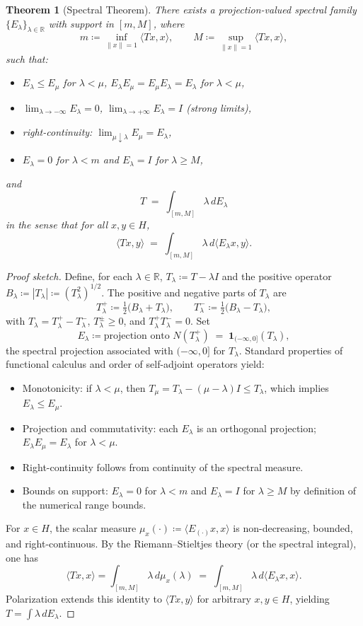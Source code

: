 \documentclass[11pt]{article}
\theoremstyle{plain}
\newtheorem{theorem}{Theorem}
\theoremstyle{definition}
\newcommand{\norm}[1]{\left\lVert #1 \right\rVert}
\begin{document}
\begin{theorem}[Spectral Theorem]
There exists a projection-valued spectral family $\{E_\lambda\}_{\lambda\in\mathbb{R}}$ with support in $[m,M]$, where
\[
m \coloneqq \inf_{\norm{x}=1}\langle Tx,x\rangle,\qquad M \coloneqq \sup_{\norm{x}=1}\langle Tx,x\rangle,
\]
such that:
\begin{itemize}
\item $E_\lambda \le E_\mu$ for $\lambda<\mu$, $E_\lambda E_\mu=E_\mu E_\lambda=E_\lambda$ for $\lambda<\mu$,
\item $\lim_{\lambda\to -\infty}E_\lambda=0$, $\lim_{\lambda\to +\infty}E_\lambda=I$ (strong limits),
\item right-continuity: $\lim_{\mu\downarrow\lambda} E_\mu = E_\lambda$,
\item $E_\lambda=0$ for $\lambda<m$ and $E_\lambda=I$ for $\lambda\ge M$,
\end{itemize}
and
\[
T \;=\; \int_{[m,M]} \lambda \, dE_\lambda
\]
in the sense that for all $x,y\in H$,
\[
\langle Tx,y\rangle \;=\; \int_{[m,M]} \lambda \, d\langle E_\lambda x, y\rangle.
\]
\end{theorem}

\begin{proof}[Proof sketch]
Define, for each $\lambda\in\mathbb{R}$, $T_\lambda \coloneqq T-\lambda I$ and the positive operator $B_\lambda \coloneqq |T_\lambda| \coloneqq (T_\lambda^2)^{1/2}$. The positive and negative parts of $T_\lambda$ are
\[
T_\lambda^{+} \coloneqq \tfrac12\big(B_\lambda + T_\lambda\big),\qquad
T_\lambda^{-} \coloneqq \tfrac12\big(B_\lambda - T_\lambda\big),
\]
with $T_\lambda = T_\lambda^{+} - T_\lambda^{-}$, $T_\lambda^{\pm}\ge 0$, and $T_\lambda^{+}T_\lambda^{-}=0$.
Set
\[
E_\lambda \coloneqq \text{projection onto } N(T_\lambda^{+}) \;=\; \mathbf{1}_{(-\infty,0]}(T_\lambda),
\]
the spectral projection associated with $(-\infty,0]$ for $T_\lambda$. Standard properties of functional calculus and order of self-adjoint operators yield:
\begin{itemize}
\item Monotonicity: if $\lambda<\mu$, then $T_\mu = T_\lambda - (\mu-\lambda)I \le T_\lambda$, which implies $E_\lambda \le E_\mu$.
\item Projection and commutativity: each $E_\lambda$ is an orthogonal projection; $E_\lambda E_\mu=E_\lambda$ for $\lambda<\mu$.
\item Right-continuity follows from continuity of the spectral measure.
\item Bounds on support: $E_\lambda=0$ for $\lambda<m$ and $E_\lambda=I$ for $\lambda\ge M$ by definition of the numerical range bounds.
\end{itemize}
For $x\in H$, the scalar measure $\mu_x(\cdot)\coloneqq \langle E_{(\cdot)}x,x\rangle$ is non-decreasing, bounded, and right-continuous. By the Riemann--Stieltjes theory (or the spectral integral), one has
\[
\langle Tx,x\rangle = \int_{[m,M]} \lambda \, d\mu_x(\lambda) \;=\; \int_{[m,M]} \lambda \, d\langle E_\lambda x, x\rangle.
\]
Polarization extends this identity to $\langle Tx,y\rangle$ for arbitrary $x,y\in H$, yielding $T=\int \lambda\, dE_\lambda$.
\end{proof}
\end{document}
